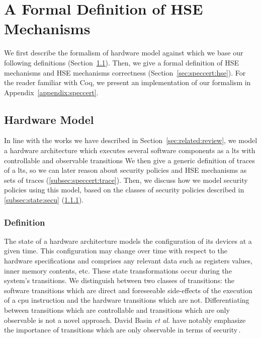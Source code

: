 \chapter{A Formal Definition of HSE Mechanisms}
\label{chapter:speccert}


\vspace{1cm}\noindent
%
We first describe the formalism of hardware model against which we base our
following definitions (Section~\ref{subsec:speccert:hardware}).
%
Then, we give a formal definition of HSE mechanisms and HSE mechanisms
correctness (Section~\ref{sec:speccert:hse}).
%
For the reader familiar with Coq, we present an implementation of our formalism
in Appendix~\ref{appendix:speccert}.

\section{Hardware Model}
\label{subsec:speccert:hardware}

In line with the works we have described in Section~\ref{sec:related:review}, we
model a hardware architecture which executes several software components as a
\ac{lts} with controllable and observable transitions
%
We then give a generic definition of traces of a \ac{lts}, so we can later
reason about security policies and HSE mechanisms as sets of traces
(\ref{subsec:speccert:trace}).
%
Then, we discuss how we model security policies using this model, based on the
classes of security policies described in \ref{subsec:state:secu}
(\ref{subsec:speccert:def}).

\subsection{Definition}
\label{subsec:speccert:def}

The state of a hardware architecture models the configuration of its devices at
a given time.
%
This configuration may change over time with respect to the hardware
specifications and comprises any relevant data such as registers values, inner
memory contents, etc.
%
These state transformations occur during the system's transitions.
%
We distinguish between two classes of transitions: the software transitions
which are direct and foreseeable side-effects of the execution of a \ac{cpu}
instruction and the hardware transitions which are not.
%
Differentiating between transitions which are controllable and transitions which
are only observable is not a novel approach.
%
David Basin \emph{et al.} have notably emphasize the importance of transitions
which are only observable in terms of security\,\cite{basin2013enforceable}.

